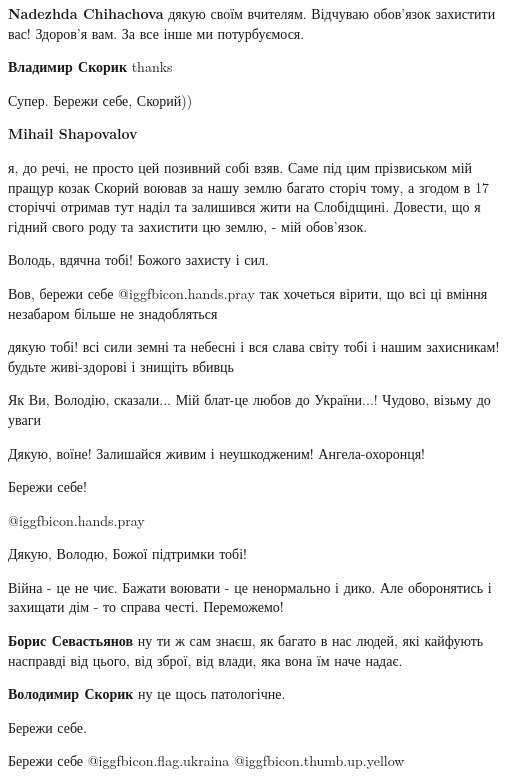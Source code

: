 \begin{itemize}
\begin{itemize} %
\textbf{Nadezhda Chihachova} дякую своїм вчителям. Відчуваю обов'язок захистити вас! Здоров'я вам. За все інше ми потурбуємося.

\textbf{Владимир Скорик} thanks
\end{itemize} %

Супер. Бережи себе, Скорий))

\textbf{Mihail Shapovalov} 

я, до речі, не просто цей позивний собі взяв. Саме під цим прізвиськом мій
пращур козак Скорий воював за нашу землю багато сторіч тому, а згодом в 17
сторіччі отримав тут наділ та залишився жити на Слобідщині. Довести, що я
гідний свого роду та захистити цю землю, - мій обов'язок.

Володь, вдячна тобі! Божого захисту і сил.

Вов, бережи себе @igg{fbicon.hands.pray}  так хочеться вірити, що всі ці вміння незабаром більше не знадобляться

дякую тобі! всі сили земні та небесні і вся слава світу тобі і нашим захисникам! будьте живі-здорові і знищіть вбивць

Як Ви, Володію, сказали... Мій блат-це любов до України...! Чудово, візьму до уваги

Дякую, воїне! Залишайся живим і неушкодженим! Ангела-охоронця!

Бережи себе!

 @igg{fbicon.hands.pray} 

Дякую, Володю, Божої підтримки тобі!


Війна - це не чиє. Бажати воювати - це ненормально і дико.
Але оборонятись і захищати дім - то справа честі.
Переможемо!

\textbf{Борис Севастьянов} ну ти ж сам знаєш, як багато в нас людей, які кайфують насправді від цього, від зброї, від влади, яка вона їм наче надає.

\textbf{Володимир Скорик} ну це щось патологічне.

Бережи себе.

Бережи себе @igg{fbicon.flag.ukraina} @igg{fbicon.thumb.up.yellow} 


\end{itemize}
